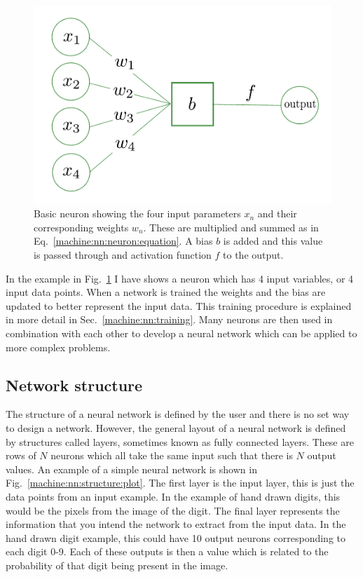 \begin{figure}[h]
    \centering
    \includegraphics[width=0.6\columnwidth]{C4_cnn/neuron.pdf}
    \caption[Basic neuron]{Basic neuron showing the four input parameters $x_n$ and their corresponding weights $w_n$. These are multiplied and summed as in Eq.~\ref{machine:nn:neuron:equation}. A bias $b$ is added and this value is passed through and activation function $f$ to the output.}
    \label{machine:nn:neuron:plot}
\end{figure}

In the example in Fig.~\ref{machine:nn:neuron:plot} I have shows a neuron which has 4 input variables, or 4 input data points. 
When a network is trained the weights and the bias are updated to better represent the input data.
This training procedure is explained in more detail in Sec.~\ref{machine:nn:training}.
Many neurons are then used in combination with each other to develop a neural network which can be applied to more complex problems.

\subsection{\label{machine:nn:structure}Network structure}

The structure of a neural network is defined by the user and there is no set way to design a network.
However, the general layout of a neural network is defined by structures called layers, sometimes known as fully connected layers. 
These are rows of $N$ neurons which all take the same input such that there is $N$ output values.
An example of a simple neural network is shown in Fig.~\ref{machine:nn:structure:plot}.
The first layer is the input layer, this is just the data points from an input example.
In the example of hand drawn digits, this would be the pixels from the image of the digit.
The final layer represents the information that you intend the network to extract from the input data. 
In the hand drawn digit example, this could have 10 output neurons corresponding to each digit 0-9. 
Each of these outputs is then a value which is related to the probability of that digit being present in the image.  

